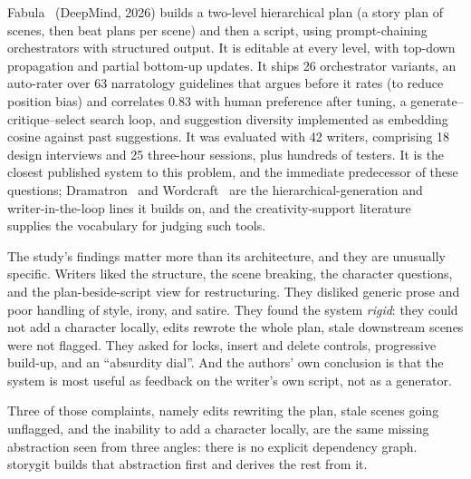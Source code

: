 \documentclass{article}
\newcommand{\storygit}{\textsf{storygit}}
\begin{document}
Fabula~\cite{mirowski2026fabula} (DeepMind, 2026) builds a two-level hierarchical plan (a
story plan of scenes, then beat plans per scene) and then a script, using prompt-chaining
orchestrators with structured output. It is editable at every level, with
top-down propagation and partial bottom-up updates. It ships 26 orchestrator variants, an
auto-rater over 63 narratology guidelines that argues before it rates (to reduce position
bias) and correlates 0.83 with human preference after tuning, a generate--critique--select
search loop, and suggestion diversity implemented as embedding cosine against past
suggestions. It was evaluated with 42 writers, comprising 18 design interviews and 25 three-hour
sessions, plus hundreds of testers. It is the closest published system to this problem,
and the immediate predecessor of these questions; Dramatron~\cite{mirowski2023dramatron}
and Wordcraft~\cite{yuan2022wordcraft} are the hierarchical-generation and
writer-in-the-loop lines it builds on, and the creativity-support
literature~\cite{cherry2014csi} supplies the vocabulary for judging such tools.

The study's findings matter more than its architecture, and they are unusually specific.
Writers liked the structure, the scene breaking, the character questions, and the plan-beside-script
view for restructuring. They disliked generic prose and poor handling of style, irony, and
satire. They found the system \emph{rigid}: they could not add a character locally, edits
rewrote the whole plan, stale downstream scenes were not flagged. They asked for locks,
insert and delete controls, progressive build-up, and an ``absurdity dial''. And the
authors' own conclusion is that the system is most useful as feedback on the writer's own
script, not as a generator.

Three of those complaints, namely edits rewriting the plan, stale scenes going unflagged,
and the inability to add a character locally, are the same missing abstraction seen from
three angles: there is no explicit dependency graph. \storygit{} builds that abstraction
first and derives the rest from it.
\end{document}
